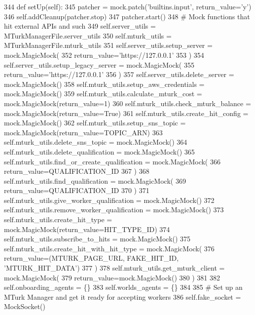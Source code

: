 \begin{DoxyCode}
344     \textcolor{keyword}{def }setUp(self):
345         patcher = mock.patch(\textcolor{stringliteral}{'builtins.input'}, return\_value=\textcolor{stringliteral}{'y'})
346         self.addCleanup(patcher.stop)
347         patcher.start()
348         \textcolor{comment}{# Mock functions that hit external APIs and such}
349         self.server\_utils = MTurkManagerFile.server\_utils
350         self.mturk\_utils = MTurkManagerFile.mturk\_utils
351         self.server\_utils.setup\_server = mock.MagicMock(
352             return\_value=\textcolor{stringliteral}{'https://127.0.0.1'}
353         )
354         self.server\_utils.setup\_legacy\_server = mock.MagicMock(
355             return\_value=\textcolor{stringliteral}{'https://127.0.0.1'}
356         )
357         self.server\_utils.delete\_server = mock.MagicMock()
358         self.mturk\_utils.setup\_aws\_credentials = mock.MagicMock()
359         self.mturk\_utils.calculate\_mturk\_cost = mock.MagicMock(return\_value=1)
360         self.mturk\_utils.check\_mturk\_balance = mock.MagicMock(return\_value=\textcolor{keyword}{True})
361         self.mturk\_utils.create\_hit\_config = mock.MagicMock()
362         self.mturk\_utils.setup\_sns\_topic = mock.MagicMock(return\_value=TOPIC\_ARN)
363         self.mturk\_utils.delete\_sns\_topic = mock.MagicMock()
364         self.mturk\_utils.delete\_qualification = mock.MagicMock()
365         self.mturk\_utils.find\_or\_create\_qualification = mock.MagicMock(
366             return\_value=QUALIFICATION\_ID
367         )
368         self.mturk\_utils.find\_qualification = mock.MagicMock(
369             return\_value=QUALIFICATION\_ID
370         )
371         self.mturk\_utils.give\_worker\_qualification = mock.MagicMock()
372         self.mturk\_utils.remove\_worker\_qualification = mock.MagicMock()
373         self.mturk\_utils.create\_hit\_type = mock.MagicMock(return\_value=HIT\_TYPE\_ID)
374         self.mturk\_utils.subscribe\_to\_hits = mock.MagicMock()
375         self.mturk\_utils.create\_hit\_with\_hit\_type = mock.MagicMock(
376             return\_value=(MTURK\_PAGE\_URL, FAKE\_HIT\_ID, \textcolor{stringliteral}{'MTURK\_HIT\_DATA'})
377         )
378         self.mturk\_utils.get\_mturk\_client = mock.MagicMock(
379             return\_value=mock.MagicMock()
380         )
381 
382         self.onboarding\_agents = \{\}
383         self.worlds\_agents = \{\}
384 
385         \textcolor{comment}{# Set up an MTurk Manager and get it ready for accepting workers}
386         self.fake\_socket = MockSocket()

\end{DoxyCode}
